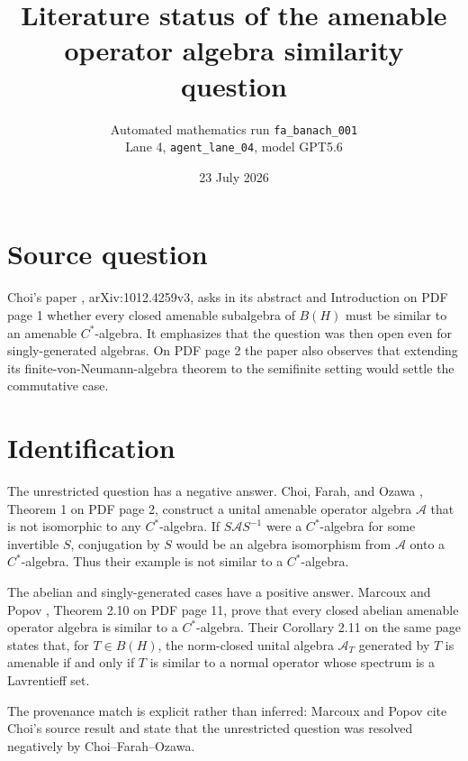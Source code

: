 \documentclass[10pt]{article}
\title{Literature status of the amenable operator algebra similarity question}
\author{Automated mathematics run \texttt{fa\_banach\_001}\\
Lane 4, \texttt{agent\_lane\_04}, model GPT5.6}
\date{23 July 2026}
\begin{document}
\maketitle

\begin{center}
\end{center}

\section*{Source question}

Choi's paper \cite{Choi2011}, arXiv:1012.4259v3, asks in its abstract and
Introduction on PDF page 1 whether every closed amenable subalgebra of
$B(H)$ must be similar to an amenable $C^*$-algebra. It emphasizes that the
question was then open even for singly-generated algebras. On PDF page 2 the
paper also observes that extending its finite-von-Neumann-algebra theorem to
the semifinite setting would settle the commutative case.

\section*{Identification}

The unrestricted question has a negative answer. Choi, Farah, and Ozawa
\cite{CFO2013}, Theorem 1 on PDF page 2, construct a unital amenable operator
algebra $\mathcal A$ that is not isomorphic to any $C^*$-algebra. If
$S\mathcal A S^{-1}$ were a $C^*$-algebra for some invertible $S$, conjugation
by $S$ would be an algebra isomorphism from $\mathcal A$ onto a $C^*$-algebra.
Thus their example is not similar to a $C^*$-algebra.

The abelian and singly-generated cases have a positive answer. Marcoux and
Popov \cite{MP2013}, Theorem 2.10 on PDF page 11, prove that every closed
abelian amenable operator algebra is similar to a $C^*$-algebra. Their
Corollary 2.11 on the same page states that, for $T\in B(H)$, the norm-closed
unital algebra $\mathcal A_T$ generated by $T$ is amenable if and only if
$T$ is similar to a normal operator whose spectrum is a Lavrentieff set.

The provenance match is explicit rather than inferred: Marcoux and Popov cite
Choi's source result and state that the unrestricted question was resolved
negatively by Choi--Farah--Ozawa.
\end{document}
